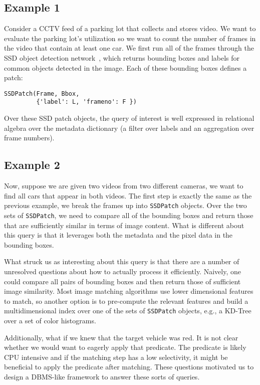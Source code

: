 \subsection{Example 1}
Consider a CCTV feed of a parking lot that collects and stores video.
We want to evaluate the parking lot's utilization so we want to count the number of frames in the video that contain at least one car.
We first run all of the frames through the SSD object detection network~\cite{liu2016ssd}, which returns bounding boxes and labels for common objects detected in the image.
Each of these bounding boxes defines a patch:
\begin{lstlisting}
SSDPatch(Frame, Bbox, 
         {'label': L, 'frameno': F })
\end{lstlisting}
Over these SSD patch objects, the query of interest is well expressed in relational algebra over the metadata dictionary (a filter over labels and an aggregation over frame numbers).

\subsection{Example 2}
Now, suppose we are given two videos from two different cameras, we want to find all cars that appear in both videos.
The first step is exactly the same as the previous example, we break the frames up into \texttt{SSDPatch} objects.
Over the two sets of \texttt{SSDPatch}, we need to compare all of the bounding boxes and return those that are sufficiently similar in terms of image content.
What is different about this query is that it leverages both the metadata and the pixel data in the bounding boxes.

What struck us as interesting about this query is that there are a number of unresolved questions about how to actually process it efficiently.
Naively, one could compare all pairs of bounding boxes and then return those of sufficient image similarity.
Most image matching algorithms use lower dimensional features to match, so another option is to pre-compute the relevant features and build a multidimensional index over one of the sets of \texttt{SSDPatch} objects, e.g., a KD-Tree over a set of color histograms.

Additionally, what if we knew that the target vehicle was red.
It is not clear whether we would want to eagerly apply that predicate. 
The predicate is likely CPU intensive and if the matching step has a low selectivity, it might be beneficial to apply the predicate after matching.
These questions motivated us to design a DBMS-like framework to answer these sorts of queries.









